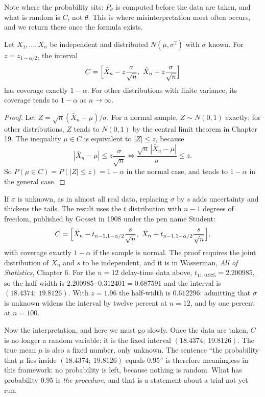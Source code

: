 Note where the probability sits: $P_\theta$ is computed before the data are taken, and what is
random is $C$, not $\theta$. This is where misinterpretation most often occurs, and we return
there once the formula exists.

\begin{teorema}
Let $X_1,\dots,X_n$ be independent and distributed $N(\mu,\sigma^2)$ with $\sigma$
known. For $z=z_{1-\alpha/2}$, the interval
\[
C=\Bigl[\bar X_n-z\frac{\sigma}{\sqrt n},\ \bar X_n+z\frac{\sigma}{\sqrt n}\Bigr]
\]
has coverage exactly $1-\alpha$. For other distributions with finite variance, its
coverage tends to $1-\alpha$ as $n\to\infty$.
\end{teorema}

\begin{proof}[Proof]
Let $Z=\sqrt n(\bar X_n-\mu)/\sigma$. For a normal sample, $Z\sim N(0,1)$ exactly;
for other distributions, $Z$ tends to $N(0,1)$ by the central limit theorem in Chapter 19.
The inequality $\mu\in C$ is equivalent to $|Z|\le z$, because
\[
|\bar X_n-\mu|\le z\frac{\sigma}{\sqrt n}
\iff \frac{\sqrt n\,|\bar X_n-\mu|}{\sigma}\le z .
\]
So $P(\mu\in C)=P(|Z|\le z)=1-\alpha$ in the normal case, and tends to $1-\alpha$
in the general case.
\end{proof}

If $\sigma$ is unknown, as in almost all real data, replacing
$\sigma$ by $s$ adds uncertainty and thickens the tails. The result uses the
$t$ distribution with $n-1$ degrees of freedom, published by Gosset in 1908 under the pen
name Student:
\[
C=\Bigl[\bar X_n-t_{n-1,1-\alpha/2}\frac{s}{\sqrt n},\
\bar X_n+t_{n-1,1-\alpha/2}\frac{s}{\sqrt n}\Bigr],
\]
with coverage exactly $1-\alpha$ if the sample is normal. The proof requires the joint
distribution of $\bar X_n$ and $s$ to be independent, and it is in Wasserman, \emph{All of
Statistics}, Chapter 6. For the $n=12$ delay-time data above, $t_{11,0.975}=2.200985$, so
the half-width is $2.200985\cdot0.312401=0.687591$ and the interval is
$(18.4374;\ 19.8126)$. With $z=1.96$ the half-width is $0.612296$: admitting that
$\sigma$ is unknown widens the interval by twelve percent at $n=12$, and by one
percent at $n=100$.

Now the interpretation, and here we must go slowly. Once the data are taken,
$C$ is no longer a random variable: it is the fixed interval $(18.4374;\ 19.8126)$. The
true mean $\mu$ is also a fixed number, only unknown. The sentence
``the probability that $\mu$ lies inside $(18.4374;\ 19.8126)$ equals $0.95$''
is therefore meaningless in this framework: no probability is left, because
nothing is random. What has probability $0.95$ is \emph{the procedure}, and that is a
statement about a trial not yet run.

